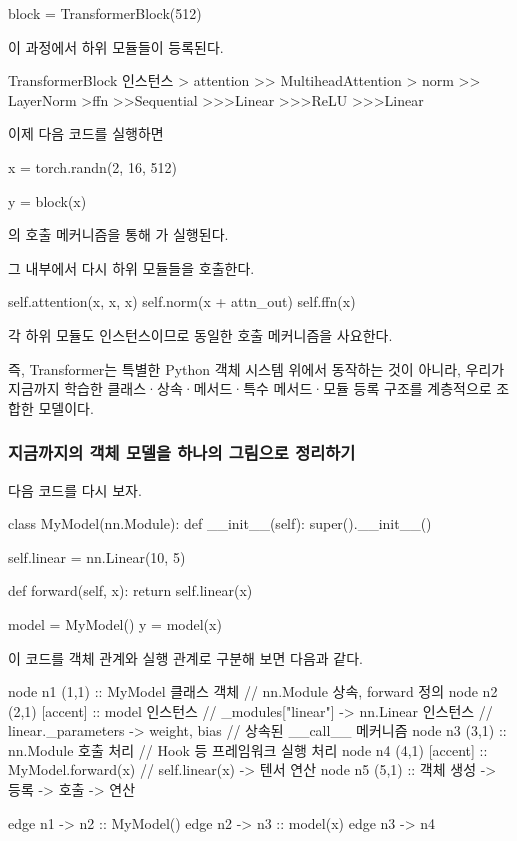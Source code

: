 \begin{dhkcode}
block = TransformerBlock(512)
\end{dhkcode}

이 과정에서 하위 모듈들이 등록된다.

\begin{dhkdir}[in=6]
TransformerBlock 인스턴스
> attention
>> MultiheadAttention
> norm
>> LayerNorm
>ffn
>>Sequential
>>>Linear
>>>ReLU
>>>Linear
\end{dhkdir}

이제 다음 코드를 실행하면

\begin{dhkcode}
x = torch.randn(2, 16, 512)

y = block(x)
\end{dhkcode}

의 호출 메커니즘을 통해 가 실행된다.

그 내부에서 다시 하위 모듈들을 호출한다.

\begin{dhkcode}
self.attention(x, x, x)
self.norm(x + attn_out)
self.ffn(x)
\end{dhkcode}

각 하위 모듈도  인스턴스이므로 동일한 호출 메커니즘을 사요한다.

즉, Transformer는 특별한 Python 객체 시스템 위에서 동작하는 것이 아니라, 우리가 지금까지 학습한 클래스·상속·메서드·특수 메서드·모듈 등록 구조를 계층적으로 조합한 모델이다.

\subsubsection{지금까지의 객체 모델을 하나의 그림으로 정리하기}

다음 코드를 다시 보자.

\begin{dhkcode}
class MyModel(nn.Module):
    def __init__(self):
        super().__init__()

        self.linear = nn.Linear(10, 5)

    def forward(self, x):
        return self.linear(x)


model = MyModel()
y = model(x)
\end{dhkcode}

이 코드를 객체 관계와 실행 관계로 구분해 보면 다음과 같다.

\begin{dhkgraph}[uniform]
node n1 (1,1) :: MyModel 클래스 객체  // nn.Module 상속, forward 정의
node n2 (2,1) [accent] :: model 인스턴스 // _modules["linear"] -> nn.Linear 인스턴스 // linear._parameters -> weight, bias // 상속된 __call__ 메커니즘
node n3 (3,1) :: nn.Module 호출 처리 // Hook 등 프레임워크 실행 처리
node n4 (4,1) [accent] :: MyModel.forward(x) // self.linear(x) -> 텐서 연산
node n5 (5,1) :: 객체 생성 -> 등록 -> 호출 -> 연산

edge n1 -> n2 :: MyModel()
edge n2 -> n3 :: model(x)
edge n3 -> n4
\end{dhkgraph}

